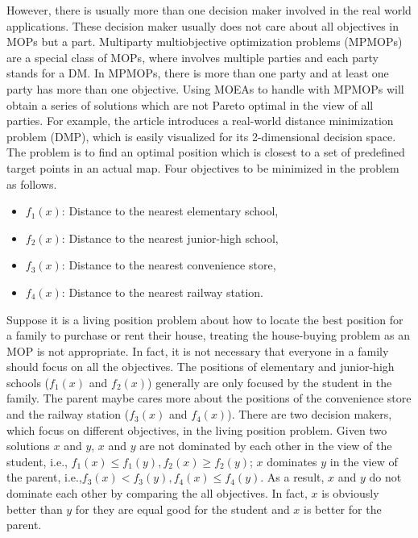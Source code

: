 \documentclass[preprint,12pt]{elsarticle}
\begin{document}
However, there is usually more than one decision maker involved in the real world applications.
These decision maker usually does not care about all objectives in MOPs but a part.
Multiparty multiobjective optimization problems (MPMOPs) are a special class of MOPs, where involves multiple parties and each party stands for a DM.
In MPMOPs, there is more than one party and at least one party has more than one objective.
Using MOEAs to handle with MPMOPs will obtain a series of solutions which are not Pareto optimal in the view of all parties.
For example, the article \cite{Ishibuchi2011} introduces a real-world distance minimization problem (DMP), which is easily visualized for its 2-dimensional decision space.
The problem is to find an optimal position which is closest to a set of predefined target points in an actual map.
Four objectives to be minimized in the problem as follows.
\begin{itemize}
	\item $f_1(x)$: Distance to the nearest elementary school,
	\item $f_2(x)$: Distance to the nearest junior-high school,
	\item $f_3(x)$: Distance to the nearest convenience store,
	\item $f_4(x)$: Distance to the nearest railway station.
\end{itemize}
Suppose it is a living position problem about how to locate the best position for a family to purchase or rent their house, treating the house-buying problem as an MOP is not appropriate.
In fact, it is not necessary that everyone in a family should focus on all the objectives.
The positions of elementary and junior-high schools ($f_1(x)$ and $f_2(x)$) generally are only focused by the student in the family.
The parent maybe cares more about the positions of the convenience store and the railway station ($f_3(x)$ and $f_4(x)$).
There are two decision makers, which focus on different objectives, in the living position problem.
Given two solutions $x$ and $y$, $x$ and $y$ are not dominated by each other in the view of the student, i.e., $f_1(x) \leq f_1(y), f_2(x) \geq f_2(y)$; $x$ dominates $y$ in the view of the parent, i.e.,$f_3(x) < f_3(y), f_4(x) \leq f_4(y)$.
As a result, $x$ and $y$ do not dominate each other by comparing the all objectives.
In fact, $x$ is obviously better than $y$ for they are equal good for the student and $x$ is better for the parent.
\end{document}
